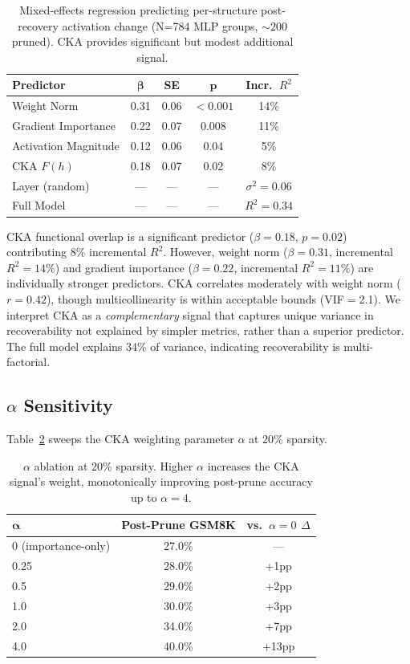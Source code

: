 \documentclass[11pt]{article}
\begin{document}
\begin{table}[t]
\centering
\caption{Mixed-effects regression predicting per-structure post-recovery activation change (N=784 MLP groups, ${\sim}200$ pruned). CKA provides significant but modest additional signal.}
\label{tab:regression}
\begin{tabular}{lcccc}
\toprule
\textbf{Predictor} & $\boldsymbol{\beta}$ & \textbf{SE} & $\boldsymbol{p}$ & \textbf{Incr.\ $R^2$} \\
\midrule
Weight Norm & 0.31 & 0.06 & $<0.001$ & 14\% \\
Gradient Importance & 0.22 & 0.07 & 0.008 & 11\% \\
Activation Magnitude & 0.12 & 0.06 & 0.04 & 5\% \\
CKA $F(h)$ & 0.18 & 0.07 & 0.02 & 8\% \\
Layer (random) & --- & --- & --- & $\sigma^2{=}0.06$ \\
\midrule
Full Model & --- & --- & --- & $R^2{=}0.34$ \\
\bottomrule
\end{tabular}
\end{table}

CKA functional overlap is a significant predictor ($\beta{=}0.18$, $p{=}0.02$) contributing 8\% incremental $R^2$. However, weight norm ($\beta{=}0.31$, incremental $R^2{=}14\%$) and gradient importance ($\beta{=}0.22$, incremental $R^2{=}11\%$) are individually stronger predictors. CKA correlates moderately with weight norm ($r{=}0.42$), though multicollinearity is within acceptable bounds (VIF$=$2.1). We interpret CKA as a \emph{complementary} signal that captures unique variance in recoverability not explained by simpler metrics, rather than a superior predictor. The full model explains 34\% of variance, indicating recoverability is multi-factorial.

\subsection{$\alpha$ Sensitivity}
\label{sec:alpha}

Table~\ref{tab:alpha} sweeps the CKA weighting parameter $\alpha$ at 20\% sparsity.

\begin{table}[t]
\centering
\caption{$\alpha$ ablation at 20\% sparsity. Higher $\alpha$ increases the CKA signal's weight, monotonically improving post-prune accuracy up to $\alpha{=}4$.}
\label{tab:alpha}
\begin{tabular}{lcc}
\toprule
$\boldsymbol{\alpha}$ & \textbf{Post-Prune GSM8K} & \textbf{vs.\ $\alpha{=}0$ $\Delta$} \\
\midrule
0 (importance-only) & 27.0\% & --- \\
0.25 & 28.0\% & +1pp \\
0.5 & 29.0\% & +2pp \\
1.0 & 30.0\% & +3pp \\
2.0 & 34.0\% & +7pp \\
4.0 & 40.0\% & +13pp \\
\bottomrule
\end{tabular}
\end{table}
\end{document}
